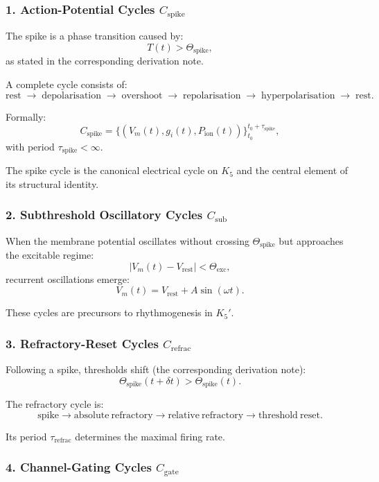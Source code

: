 \subsubsection{1. Action-Potential Cycles $C_{\mathrm{spike}}$}

The spike is a phase transition caused by:
\[
  T(t) > \Theta_{\mathrm{spike}},
\]
as stated in the corresponding derivation note.

A complete cycle consists of:
\[
  \mathrm{rest}
  \;\to\;
  \mathrm{depolarisation}
  \;\to\;
  \mathrm{overshoot}
  \;\to\;
  \mathrm{repolarisation}
  \;\to\;
  \mathrm{hyperpolarisation}
  \;\to\;
  \mathrm{rest}.
\]

Formally:
\[
  C_{\mathrm{spike}}
  =\{(V_m(t), g_i(t), P_{\mathrm{ion}}(t))\}_{t_0}^{t_0+\tau_{\mathrm{spike}}},
\]
with period $\tau_{\mathrm{spike}} < \infty$.

The spike cycle is the canonical electrical cycle on $K_5$ and the
central element of its structural identity.

\subsubsection{2. Subthreshold Oscillatory Cycles $C_{\mathrm{sub}}$}

When the membrane potential oscillates without crossing
$\Theta_{\mathrm{spike}}$ but approaches the excitable regime:
\[
  |V_m(t) - V_{\mathrm{rest}}| < \Theta_{\mathrm{exc}},
\]
recurrent oscillations emerge:
\[
  V_m(t) = V_{\mathrm{rest}} + A\sin(\omega t).
\]

These cycles are precursors to rhythmogenesis in $K_5'$.

\subsubsection{3. Refractory-Reset Cycles $C_{\mathrm{refrac}}$}

Following a spike, thresholds shift (the corresponding derivation note):
\[
  \Theta_{\mathrm{spike}}(t+\delta t)
  >
  \Theta_{\mathrm{spike}}(t).
\]

The refractory cycle is:
\[
  \mathrm{spike}
  \to
  \mathrm{absolute\ refractory}
  \to
  \mathrm{relative\ refractory}
  \to
  \mathrm{threshold\ reset}.
\]

Its period $\tau_{\mathrm{refrac}}$ determines the maximal firing rate.

\subsubsection{4. Channel-Gating Cycles $C_{\mathrm{gate}}$}

